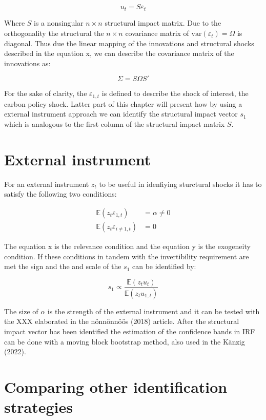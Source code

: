 \documentclass[
  12pt,
  a4paper,
]{report}
\begin{document}
\[
u_t = S\varepsilon_t
\]

Where \(S\) is a nonsingular \(n \times n\) structural impact matrix. Due to the orthogonality the structural the \(n \times n\) covariance matrix of \(\text{var}(\varepsilon_t)=\Omega\) is diagonal. Thus due the linear mapping of the innovations and structural shocks described in the equation x, we can describe the covariance matrix of the innovations as:

\[
\Sigma = S \Omega S'
\]

For the sake of clarity, the \(\varepsilon_{1,t}\) is defined to describe the shock of interest, the carbon policy shock. Latter part of this chapter will present how by using a external instrument approach we can identify the structural impact vector \(s_1\) which is analogous to the first column of the structural impact matrix \(S\).

\hypertarget{external-instrument}{%
\section{External instrument}\label{external-instrument}}

For an external instrument \(z_t\) to be useful in idenfiying sturctural shocks it has to satisfy the following two conditions:

\[
\begin{aligned}
\mathbb{E}(z_t \varepsilon_{1,t}) &= \alpha \neq 0 \\
\mathbb{E}(z_t \varepsilon_{i\neq 1,t}) &= 0 
\end{aligned}
\]

The equation x is the relevance condition and the equation y is the exogeneity condition. If these conditions in tandem with the invertibility requirement are met the sign and the and scale of the \(s_1\) can be identified by:

\begin{equation}
s_1 \propto \frac{\mathbb{E}(z_t u_t)}{\mathbb{E}(z_t u_{1,t})}
\label{eq:prop}
\end{equation}

The size of \(\alpha\) is the strength of the external instrument and it can be tested with the XXX elaborated in the nönnönnöös (2018) article. After the structural impact vector has been identified the estimation of the confidence bands in IRF can be done with a moving block bootstrap method, also used in the Känzig (2022).

\hypertarget{comparing-other-identification-strategies}{%
\section{Comparing other identification strategies}\label{comparing-other-identification-strategies}}
\end{document}
